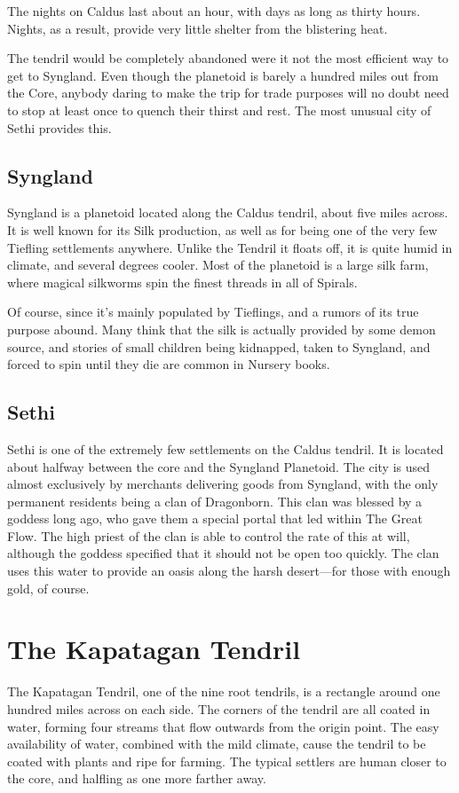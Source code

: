 \begin{multicols}{2}
The nights on Caldus last about an hour, with days as long as thirty hours.
Nights, as a result, provide very little shelter from the blistering heat.

The tendril would be completely abandoned were it not the most efficient way to get to Syngland.
Even though the planetoid is barely a hundred miles out from the Core, anybody daring to make the trip for trade purposes will no doubt need to stop at least once to quench their thirst and rest.
The most unusual city of Sethi provides this.

\subsection{Syngland}
Syngland is a planetoid located along the Caldus tendril, about five miles across.
It is well known for its Silk production, as well as for being one of the very few Tiefling settlements anywhere.
Unlike the Tendril it floats off, it is quite humid in climate, and several degrees cooler.
Most of the planetoid is a large silk farm, where magical silkworms spin the finest threads in all of Spirals.

Of course, since it's mainly populated by Tieflings, and a rumors of its true purpose abound.
Many think that the silk is actually provided by some demon source, and stories of small children being kidnapped, taken to Syngland, and forced to spin until they die are common in Nursery books.

\subsection{Sethi}
Sethi is one of the extremely few settlements on the Caldus tendril.
It is located about halfway between the core and the Syngland Planetoid.
The city is used almost exclusively by merchants delivering goods from Syngland, with the only permanent residents being a clan of Dragonborn.
This clan was blessed by a goddess long ago, who gave them a special portal that led within The Great Flow.
The high priest of the clan is able to control the rate of this at will, although the goddess specified that it should not be open too quickly.
The clan uses this water to provide an oasis along the harsh desert---for those with enough gold, of course. 


\section{The Kapatagan Tendril}
The Kapatagan Tendril, one of the nine root tendrils, is a rectangle around one hundred miles across on each side.
The corners of the tendril are all coated in water, forming four streams that flow outwards from the origin point.
The easy availability of water, combined with the mild climate, cause the tendril to be coated with plants and ripe for farming.
The typical settlers are human closer to the core, and halfling as one more farther away. 


\end{multicols}
